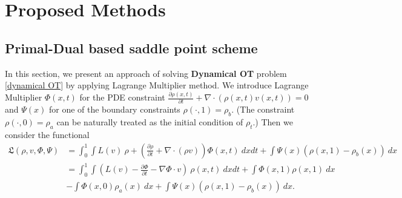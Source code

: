 \documentclass{article}
\begin{document}
\section{Proposed Methods }\label{derivation } %
\subsection{Primal-Dual based saddle point scheme}\label{prototype saddle problem}
In this section, we present an approach of solving \textbf{Dynamical OT} problem \eqref{dynamical OT} by applying Lagrange Multiplier method. We introduce Lagrange Multiplier $\Phi(x,t)$ for the PDE constraint $\frac{\partial\rho(x,t)}{\partial t} + \nabla\cdot(\rho(x,t){v}(x,t)) = 0 $ and $\Psi(x)$ for one of the boundary constraints $\rho(\cdot, 1) = \rho_b$. (The constraint $\rho( \cdot,0)=\rho_a$ can be naturally treated as the initial condition of $\rho_t$.) Then we consider the functional
\begin{align}
  \mathfrak{L}(\rho,{v},\Phi,\Psi) &=  \int_0^1\int L({v})~\rho + \left(\frac{\partial\rho}{\partial t} + \nabla\cdot(\rho{v})\right)\Phi(x,t)~dxdt + \int \Psi(x)(\rho(x,1)-\rho_b(x))~dx  \nonumber\\
 &=  \int_0^1\int \left( L({v}) -\frac{\partial\Phi}{\partial t} - \nabla\Phi\cdot{v} \right) ~\rho(x,t)~dx dt  \label{reformulation of L of original problem} + \int \Phi(x,1)\rho(x,1)~dx \\
 &- \int \Phi(x,0)\rho_a(x)~dx +\int \Psi(x) (\rho(x,1)-\rho_b(x))~dx. \nonumber
\end{align}
\end{document}

